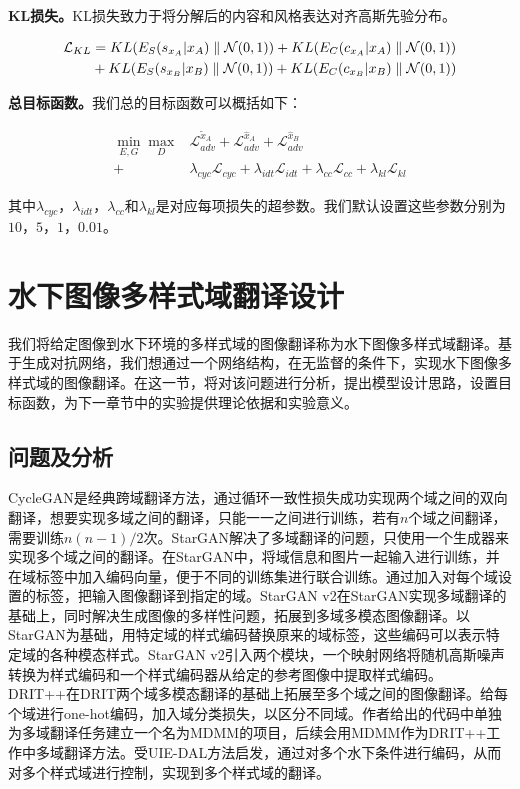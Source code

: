 \textbf{KL损失。}KL损失致力于将分解后的内容和风格表达对齐高斯先验分布。

\begin{equation}
\begin{split}
\mathcal{L}_{KL}& = \mathnormal{KL}(E_S(s_{x_A}|x_A)\parallel \mathcal{N}(0,1)) + \mathnormal{KL}(E_C(c_{x_A}|x_A)\parallel \mathcal{N}(0,1)) \\
 & + \mathnormal{KL}(E_S(s_{x_B}|x_B)\parallel \mathcal{N}(0,1)) + \mathnormal{KL}(E_C(c_{x_B}|x_B)\parallel \mathcal{N}(0,1))
\end{split}
\label{eq:KL}
\end{equation}

\textbf{总目标函数。}我们总的目标函数可以概括如下：

\begin{equation}
\label{equ:full}
\begin{aligned}
\min_{E,G}\max_{D} & \mathcal{L}_{adv}^{\tilde{x}_A}+\mathcal{L}_{adv}^{\hat{x}_A}+\mathcal{L}_{adv}^{\hat{x}_B} \\
+&\lambda_{cyc}\mathcal{L}_{cyc}+\lambda_{idt}\mathcal{L}_{idt}+\lambda_{cc}\mathcal{L}_{cc}+\lambda_{kl}\mathcal{L}_{kl}
\end{aligned}
\end{equation}

其中$\lambda_{cyc}$，$\lambda_{idt}$，$\lambda_{cc}$和$\lambda_{kl}$是对应每项损失的超参数。我们默认设置这些参数分别为$10$，$5$，$1$，$0.01$。

\section{水下图像多样式域翻译设计}
我们将给定图像到水下环境的多样式域的图像翻译称为水下图像多样式域翻译。基于生成对抗网络，我们想通过一个网络结构，在无监督的条件下，实现水下图像多样式域的图像翻译。在这一节，将对该问题进行分析，提出模型设计思路，设置目标函数，为下一章节中的实验提供理论依据和实验意义。

\subsection{问题及分析}

CycleGAN是经典跨域翻译方法，通过循环一致性损失成功实现两个域之间的双向翻译，想要实现多域之间的翻译，只能一一之间进行训练，若有$n$个域之间翻译，需要训练$n(n-1)/2$次。StarGAN解决了多域翻译的问题，只使用一个生成器来实现多个域之间的翻译。在StarGAN中，将域信息和图片一起输入进行训练，并在域标签中加入编码向量，便于不同的训练集进行联合训练。通过加入对每个域设置的标签，把输入图像翻译到指定的域。StarGAN v2在StarGAN实现多域翻译的基础上，同时解决生成图像的多样性问题，拓展到多域多模态图像翻译。以StarGAN为基础，用特定域的样式编码替换原来的域标签，这些编码可以表示特定域的各种模态样式。StarGAN v2引入两个模块，一个映射网络将随机高斯噪声转换为样式编码和一个样式编码器从给定的参考图像中提取样式编码。DRIT++在DRIT两个域多模态翻译的基础上拓展至多个域之间的图像翻译。给每个域进行one-hot编码，加入域分类损失，以区分不同域。作者给出的代码中单独为多域翻译任务建立一个名为MDMM的项目，后续会用MDMM作为DRIT++工作中多域翻译方法。受UIE-DAL方法启发，通过对多个水下条件进行编码，从而对多个样式域进行控制，实现到多个样式域的翻译。

